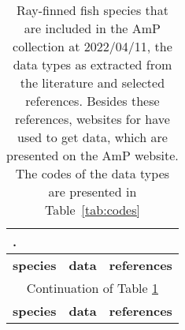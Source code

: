 {\footnotesize\begin{longtable}[c]{p{3.5cm}p{5.5cm}p{5.5cm}} 
\caption{\label{tab:species}\protect\small
Ray-finned fish species that are included in the AmP collection at 2022/04/11, the data types as extracted from the literature and selected references. Besides these references, websites for have used to get data, which are presented on the AmP website. The codes of the data types are presented in Table~\ref{tab:codes}}. \\ 

\hline
\textbf{species} & \textbf{data} & \textbf{references} \\ \hline
\hline
\endfirsthead

\hline
\multicolumn{3}{|c|}{Continuation of Table \ref{tab:species}} \\ 
\hline
\textbf{species} & \textbf{data} & \textbf{references} \\ 
\hline
\endhead


\end{longtable}}
